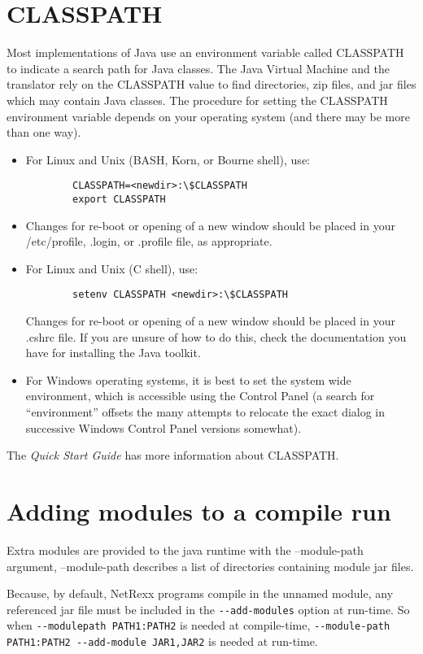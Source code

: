 \section{CLASSPATH}
Most implementations of Java use an environment variable called
CLASSPATH to indicate a search path for Java classes. The Java Virtual
Machine and the \nr{} translator rely on the CLASSPATH value to find directories, zip files, and jar files which may contain Java classes. 
The procedure for setting the CLASSPATH environment variable depends on your operating system (and there may be more than one way).
\begin{itemize}
\item For Linux and Unix (BASH, Korn, or Bourne shell), use:
\begin{verbatim}
        CLASSPATH=<newdir>:\$CLASSPATH 
        export CLASSPATH
\end{verbatim}

\item Changes for re-boot or opening of a new window should be placed in your /etc/profile, .login, or .profile file, as appropriate. 
\item For Linux and Unix (C shell), use:
\begin{verbatim}
        setenv CLASSPATH <newdir>:\$CLASSPATH 
\end{verbatim}
Changes for re-boot or opening of a new window should be placed in
your .cshrc file. If you are unsure of how to do this, check the
documentation you have for installing the Java toolkit.
\item For Windows operating systems, it is best to set the system wide
  environment, which is accessible using the Control Panel (a search
  for ``environment'' offsets the many attempts to relocate the exact
  dialog in successive Windows Control Panel versions somewhat).
\end{itemize}
The \emph{Quick Start Guide} has more information about CLASSPATH.

\section{Adding modules to a compile run}
Extra modules are provided to the java runtime with the --module-path argument, --module-path describes a list of directories containing module jar files.

Because, by default, NetRexx programs compile in the unnamed module, any referenced jar file must be included in the \texttt{-{}-add-modules} option at run-time.
So when \texttt{-{}-module\-path PATH1:PATH2} is needed at compile-time, \texttt{-{}-module-path PATH1:PATH2 -{}-add-module JAR1,JAR2} is needed at run-time.

